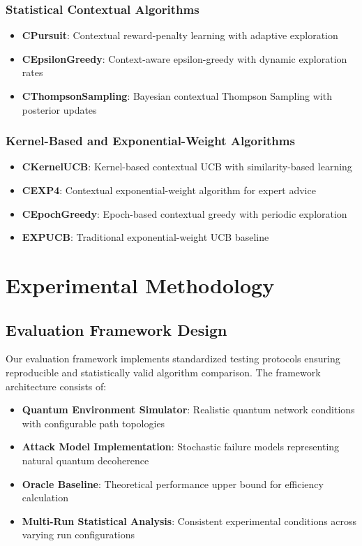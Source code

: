 \documentclass[12pt,a4paper]{article}
\begin{document}
\subsubsection{Statistical Contextual Algorithms}
\begin{itemize}
\item \textbf{CPursuit}: Contextual reward-penalty learning with adaptive exploration
\item \textbf{CEpsilonGreedy}: Context-aware epsilon-greedy with dynamic exploration rates
\item \textbf{CThompsonSampling}: Bayesian contextual Thompson Sampling with posterior updates
\end{itemize}

\subsubsection{Kernel-Based and Exponential-Weight Algorithms}
\begin{itemize}
\item \textbf{CKernelUCB}: Kernel-based contextual UCB with similarity-based learning
\item \textbf{CEXP4}: Contextual exponential-weight algorithm for expert advice
\item \textbf{CEpochGreedy}: Epoch-based contextual greedy with periodic exploration
\item \textbf{EXPUCB}: Traditional exponential-weight UCB baseline
\end{itemize}

\section{Experimental Methodology}

\subsection{Evaluation Framework Design}

Our evaluation framework implements standardized testing protocols ensuring reproducible and statistically valid algorithm comparison. The framework architecture consists of:

\begin{itemize}
\item \textbf{Quantum Environment Simulator}: Realistic quantum network conditions with configurable path topologies
\item \textbf{Attack Model Implementation}: Stochastic failure models representing natural quantum decoherence
\item \textbf{Oracle Baseline}: Theoretical performance upper bound for efficiency calculation
\item \textbf{Multi-Run Statistical Analysis}: Consistent experimental conditions across varying run configurations
\end{itemize}
\end{document}
